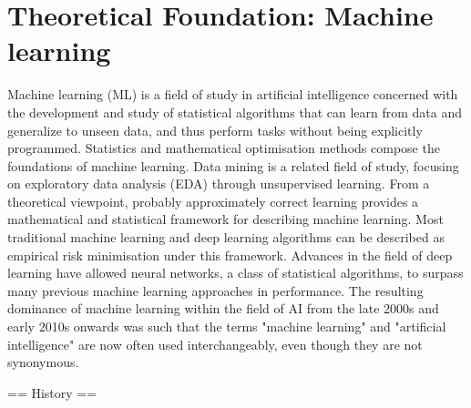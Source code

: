 \documentclass[12pt,a4paper]{report}
\begin{document}
\section{Theoretical Foundation: Machine learning}
Machine learning (ML) is a field of study in artificial intelligence concerned with the development and study of statistical algorithms that can learn from  data and generalize to unseen data, and thus perform tasks without being explicitly programmed.
Statistics and mathematical optimisation methods compose the foundations of machine learning. Data mining is a related field of study, focusing on exploratory data analysis (EDA) through unsupervised learning.
From a theoretical viewpoint, probably approximately correct learning provides a mathematical and statistical framework for describing machine learning. Most traditional machine learning and deep learning algorithms can be described as empirical risk minimisation under this framework.
Advances in the field of deep learning have allowed neural networks, a class of statistical algorithms, to surpass many previous machine learning approaches in performance. The resulting dominance of machine learning within the field of AI from the late 2000s and early 2010s onwards was such that the terms "machine learning" and "artificial intelligence" are now often used interchangeably, even though they are not synonymous.


== History ==
\end{document}
